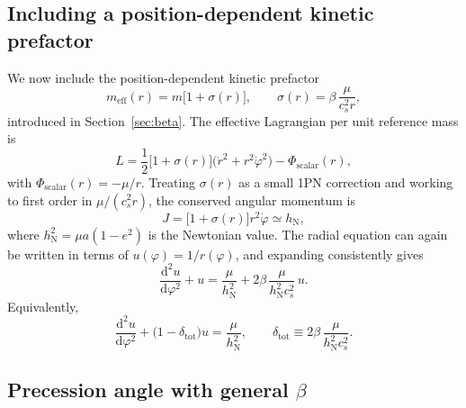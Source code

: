 \documentclass[11pt]{article}
\newcommand{\cS}{c_s}
\newcommand{\dd}{\mathrm{d}}
\begin{document}
\subsection{Including a position-dependent kinetic prefactor}
\label{app:precession_with_sigma}

We now include the position-dependent kinetic prefactor
\begin{equation}
  m_{\mathrm{eff}}(r)
  = m\bigl[1 + \sigma(r)\bigr],
  \qquad
  \sigma(r) = \beta\,\frac{\mu}{\cS^2 r},
\end{equation}
introduced in Section~\ref{sec:beta}. The effective Lagrangian per unit reference mass is
\begin{equation}
  L
  = \frac{1}{2}\bigl[1 + \sigma(r)\bigr]
    \bigl(\dot{r}^2 + r^2 \dot{\varphi}^2\bigr)
    - \Phi_{\mathrm{scalar}}(r),
\end{equation}
with $\Phi_{\mathrm{scalar}}(r) = -\mu/r$. Treating $\sigma(r)$ as a small 1PN correction and working to first order in $\mu/(\cS^2 r)$, the conserved angular momentum is
\begin{equation}
  J = \bigl[1 + \sigma(r)\bigr] r^2 \dot{\varphi} \simeq h_{\mathrm{N}},
\end{equation}
where $h_{\mathrm{N}}^2 = \mu a(1-e^2)$ is the Newtonian value. The radial equation can again be written in terms of $u(\varphi) = 1/r(\varphi)$, and expanding consistently gives
\begin{equation}
  \frac{\dd^2 u}{\dd \varphi^2} + u
  = \frac{\mu}{h_{\mathrm{N}}^2}
    + 2\beta\,\frac{\mu}{h_{\mathrm{N}}^2 \cS^2}\,u.
\end{equation}
Equivalently,
\begin{equation}
  \frac{\dd^2 u}{\dd \varphi^2}
  + \bigl(1 - \delta_{\mathrm{tot}}\bigr) u
  = \frac{\mu}{h_{\mathrm{N}}^2},
  \qquad
  \delta_{\mathrm{tot}} \equiv 2\beta\,\frac{\mu}{h_{\mathrm{N}}^2 \cS^2}.
\end{equation}

\subsection{Precession angle with general \texorpdfstring{$\beta$}{beta}}
\label{app:precession_beta_result}
\end{document}
